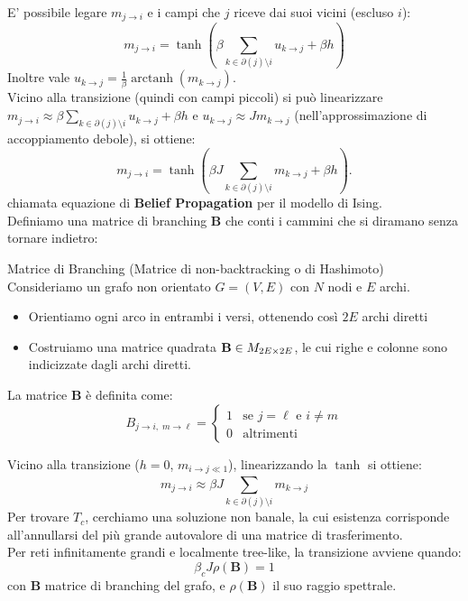 E' possibile legare $m_{j \to i}$ e i campi che $j$ riceve dai suoi vicini (escluso $i$):
\begin{equation}
    m_{j \to i}=\tanh(\beta \sum_{k \in \partial (j)\setminus i}^{}u_{k \to j}+\beta h)
\end{equation}
Inoltre vale $u_{k \to j}=\frac{1}{\beta} \operatorname{arctanh}(m_{k \to j})$.\\

Vicino alla transizione (quindi con campi piccoli) si può linearizzare $m_{j \to i} \approx \beta \sum_{k \in \partial (j) \setminus i}^{}u_{k \to j} + \beta h $ e $u_{k \to j} \approx J m_{k \to j}$ (nell'approssimazione di accoppiamento debole), si ottiene:
\begin{equation}
    m_{j\to i} = \tanh\!\left(\beta J \sum_{k\in\partial(j)\setminus i} m_{k\to j} + \beta h\right).
\end{equation}
chiamata equazione di \textbf{Belief Propagation} per il modello di Ising.\\

Definiamo una matrice di branching $\mathbf{B}$ che conti i cammini che si diramano senza tornare indietro:
\begin{boxb}{Matrice di Branching (Matrice di non-backtracking o di Hashimoto)}
Consideriamo un grafo non orientato $G=(V,E)$ con $N$ nodi e $E$ archi.
\begin{itemize}
    \item Orientiamo ogni arco in entrambi i versi, ottenendo così $2E$ archi diretti
    \item Costruiamo una matrice quadrata $\mathbf{B} \in M_{2E \times 2E}$, le cui righe e colonne sono indicizzate dagli archi diretti.
    \end{itemize}
La matrice $\mathbf{B}$ è definita come:
\begin{equation}
    B_{j\to i,\; m\to \ell} =
\begin{cases}
1 & \text{se } j = \ell \text{ e } i \neq m \\
0 & \text{altrimenti}
\end{cases}
\end{equation}
\end{boxb}
Vicino alla transizione ($h=0$, $m_{i \to j \ll 1}$), linearizzando la $\tanh$ si ottiene:
\begin{equation}
    m_{j \to i} \approx \beta J \sum_{k \in \partial (j) \setminus i}^{}m_{k \to j}
\end{equation}
Per trovare $T_c$, cerchiamo una soluzione non banale, la cui esistenza corrisponde all'annullarsi del più grande autovalore di una matrice di trasferimento.\\
Per reti infinitamente grandi e localmente tree-like, la transizione avviene quando:
\begin{equation}
    \beta_c J \rho (\mathbf{B})=1
\end{equation}
con $\mathbf{B}$ matrice di branching del grafo, e $\rho(\mathbf{B})$ il suo raggio spettrale.\\


